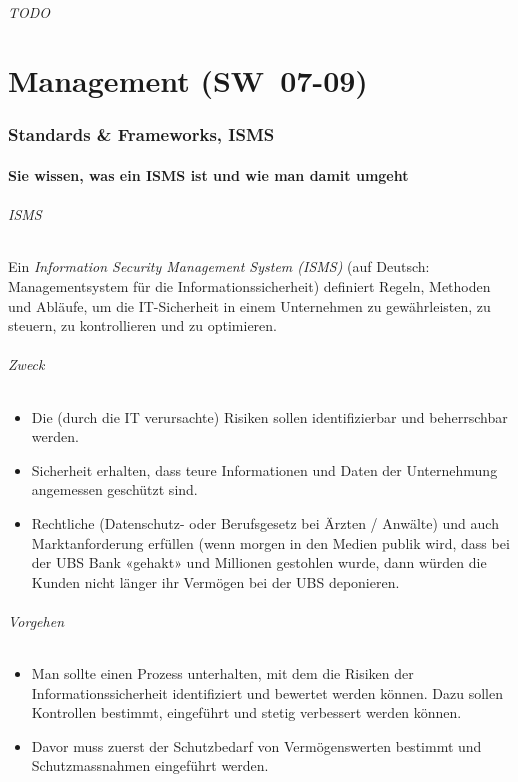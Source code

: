 \documentclass[10pt,a4paper]{article}
\begin{document}
\paragraph*{TODO}


\part{Management (SW~07-09)}
\section{Standards \& Frameworks, ISMS}

\subsection*{Sie wissen, was ein ISMS ist und wie man damit umgeht}
\paragraph*{ISMS}Ein \textsl{Information Security Management System (ISMS)} (auf Deutsch: Managementsystem für die Informationssicherheit) definiert Regeln, Methoden und Abläufe, um die IT-Sicherheit in einem Unternehmen zu gewährleisten, zu steuern, zu kontrollieren und zu optimieren.
\paragraph*{Zweck}
\begin{itemize}[noitemsep,topsep=0pt,leftmargin=*]
    \item Die (durch die IT verursachte) Risiken sollen identifizierbar und beherrschbar werden.
    \item Sicherheit erhalten, dass teure Informationen und Daten der Unternehmung angemessen geschützt sind.
    \item Rechtliche (Datenschutz- oder Berufsgesetz bei Ärzten / Anwälte) und auch Marktanforderung erfüllen (wenn morgen in den Medien publik wird, dass bei der UBS Bank «gehakt» und Millionen gestohlen wurde, dann würden die Kunden nicht länger ihr Vermögen bei der UBS deponieren.
\end{itemize}
\paragraph*{Vorgehen}
\begin{itemize}[noitemsep,topsep=0pt,leftmargin=*]
    \item Man sollte einen Prozess unterhalten, mit dem die Risiken der Informationssicherheit identifiziert und bewertet werden können. Dazu sollen Kontrollen bestimmt, eingeführt und stetig verbessert werden können.
    \item Davor muss zuerst der Schutzbedarf von Vermögenswerten bestimmt und Schutzmassnahmen eingeführt werden.
\end{itemize}
\end{document}
